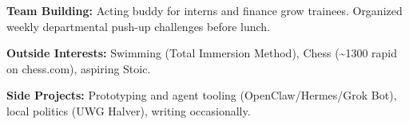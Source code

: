 \documentclass[11pt, a4paper]{awesome-cv}
\begin{document}



\begin{cvparagraph}

  \textbf{Team Building:} Acting buddy for interns and finance grow trainees. 
  Organized weekly departmental push-up challenges before lunch.

  \textbf{Outside Interests:} Swimming (Total Immersion Method), 
  Chess (\textasciitilde1300 rapid on chess.com), aspiring Stoic.

  \textbf{Side Projects:} Prototyping and agent tooling (OpenClaw/Hermes/Grok Bot), local politics (UWG Halver), writing occasionally. 

\end{cvparagraph}
\end{document}
